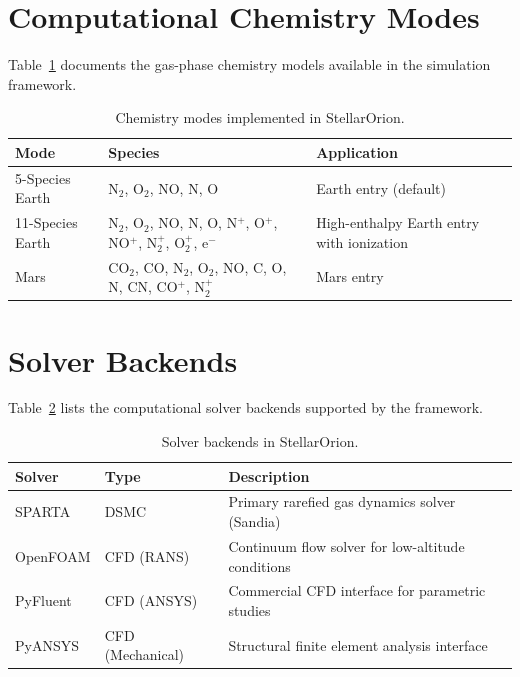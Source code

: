 \section{Computational Chemistry Modes}
\label{sec:chemistry_modes}

Table~\ref{tab:chemistry} documents the gas-phase chemistry models available in the simulation framework.

\begin{table}[H]
\centering
\caption{Chemistry modes implemented in StellarOrion.}
\label{tab:chemistry}
\begin{tabularx}{\textwidth}{@{}l >{\RaggedRight\arraybackslash}p{} >{\RaggedRight\arraybackslash}X@{}}
\hline
\textbf{Mode} & \textbf{Species} & \textbf{Application} \\
\hline
5-Species Earth & N$_2$, O$_2$, NO, N, O & Earth entry (default) \\
11-Species Earth & N$_2$, O$_2$, NO, N, O, N$^+$, O$^+$, NO$^+$, N$_2^+$, O$_2^+$, e$^-$ & High-enthalpy Earth entry with ionization \\
Mars & CO$_2$, CO, N$_2$, O$_2$, NO, C, O, N, CN, CO$^+$, N$_2^+$ & Mars entry \\
\hline
\end{tabularx}
\end{table}

\section{Solver Backends}
\label{sec:solver_backends}

Table~\ref{tab:solvers} lists the computational solver backends supported by the framework.

\begin{table}[H]
\centering
\caption{Solver backends in StellarOrion.}
\label{tab:solvers}
\begin{tabularx}{\textwidth}{@{}l l >{\RaggedRight\arraybackslash}X@{}}
\hline
\textbf{Solver} & \textbf{Type} & \textbf{Description} \\
\hline
SPARTA & DSMC & Primary rarefied gas dynamics solver (Sandia) \\
OpenFOAM & CFD (RANS) & Continuum flow solver for low-altitude conditions \\
PyFluent & CFD (ANSYS) & Commercial CFD interface for parametric studies \\
PyANSYS & CFD (Mechanical) & Structural finite element analysis interface \\
\hline
\end{tabularx}
\end{table}


